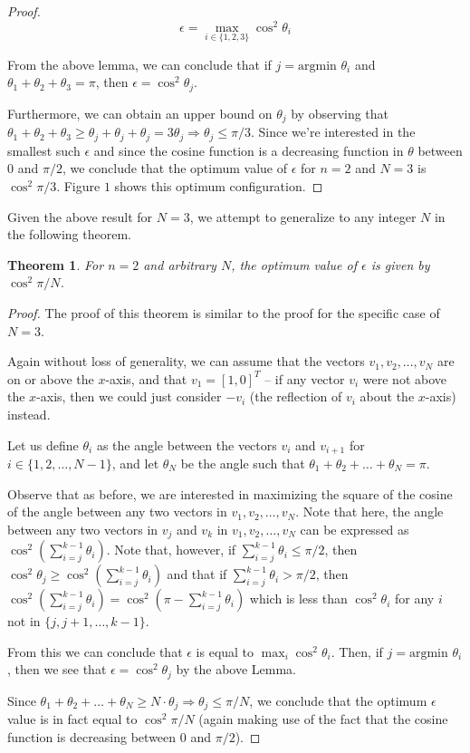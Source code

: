 \documentclass[11pt,letterpaper,twoside,english]{article}
\theoremstyle{theorem}
\newtheorem{theorem}{Theorem}[section]
\theoremstyle{remark}
\begin{document}
\begin{proof}
$$\epsilon = \max_{i \in \{1,2,3\}} \cos ^2 \theta_i$$

From the above lemma, we can conclude that if $j = \text{argmin } \theta_i$ and $\theta_1 + \theta_2 + \theta_3 = \pi$, then $\epsilon = \cos^2 \theta_j$.

Furthermore, we can obtain an upper bound on $\theta_j$ by observing that $\theta_ 1 + \theta_ 2 + \theta_3 \geq \theta_ j + \theta_j + \theta_j = 3 \theta_j \Rightarrow \theta_j \leq \pi/3$. Since we're interested in the smallest such $\epsilon$ and since the cosine function is a decreasing function in $\theta$ between $0$ and $\pi/2$, we conclude that the optimum value of $\epsilon$ for $n=2$ and $N=3$ is $\cos^2 \pi / 3$. Figure $1$ shows this optimum configuration.

\end{proof}

Given the above result for $N=3$, we attempt to generalize to any integer $N$ in the following theorem.

\begin{theorem}
For $n=2$ and arbitrary $N$, the optimum value of $\epsilon$ is given by $\cos^2 \pi/N$.
\end{theorem}

\begin{proof}
The proof of this theorem is similar to the proof for the specific case of $N=3$.

Again without loss of generality, we can assume that the vectors $v_1, v_2, \ldots, v_N$ are on or above the $x$-axis, and that $v_1 = [1,0]^T$ -- if any vector $v_i$ were not above the $x$-axis, then we could just consider $-v_i$ (the reflection of $v_i$ about the $x$-axis) instead.

Let us define $\theta_i$ as the angle between the vectors $v_i$ and $v_{i+1}$ for $i \in \{1, 2, \ldots, N-1\}$, and let $\theta_N$ be the angle such that $\theta_1 + \theta_2 + \ldots + \theta_N = \pi$.

Observe that as before, we are interested in maximizing the square of the cosine of the angle between any two vectors in $v_1, v_2, \ldots, v_N$. Note that here, the angle between any two vectors in $v_j$ and $v_k$ in $v_1, v_2, \ldots, v_N$ can be expressed as $\cos^2 (\sum_{i=j} ^{k-1} \theta_i)$. Note that, however, if $\sum_{i=j}^{k-1} \theta_i \leq \pi/2$, then $\cos^2 \theta_j \geq \cos^2(\sum_{i=j}^{k-1} \theta_i)$ and that if $\sum_{i=j}^{k-1} \theta_i > \pi/2$, then $\cos^2 (\sum_{i=j}^{k-1} \theta_i) = \cos^2 (\pi - \sum_{i=j}^{k-1} \theta_i)$ which is less than $\cos^2 \theta_i$ for any $i$ not in $\{j, j+1, \ldots, k-1\}$.

From this we can conclude that $\epsilon$ is equal to $\max_i \cos^2 \theta_i$. Then, if $j = \text{argmin } \theta_i$, then we see that $\epsilon = \cos^2 \theta_j$ by the above Lemma.

Since $\theta_ 1 + \theta_2 + \ldots + \theta_N \geq N \cdot \theta_j \Rightarrow \theta_j \leq \pi/N$, we conclude that the optimum $\epsilon$ value is in fact equal to $\cos^2 \pi/N$ (again making use of the fact that the cosine function is decreasing between $0$ and $\pi/2$).
\end{proof}
\end{document}
